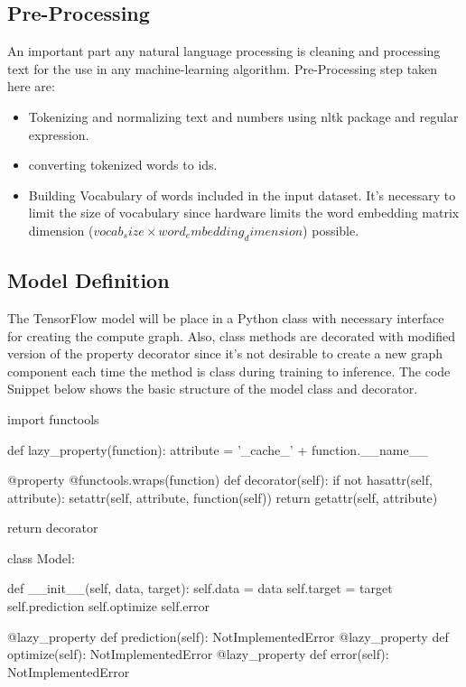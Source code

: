 \documentclass{article}
\begin{document}
\subsection{Pre-Processing}

An important part any natural language processing is cleaning and processing text for the use in any machine-learning algorithm. Pre-Processing step taken here are:

\begin{itemize}

        \item Tokenizing and normalizing text and numbers using nltk package and regular expression.
        \item converting tokenized words to ids.
        \item Building Vocabulary of words included in the input dataset. It's necessary to limit the size of vocabulary since hardware limits the word embedding matrix dimension ($vocab_size \times word_embedding_dimension$) possible.

\end{itemize}

\subsection{Model Definition}

The TensorFlow model will be place in a Python class with necessary interface for creating the compute graph. Also, class methods are decorated with modified version of the property decorator since it's not desirable to create a new graph component each time the method is class during training to inference. The code Snippet below shows the basic structure of the model class and decorator.


\begin{python}

        import functools

        def lazy_property(function):
                attribute = '_cache_' + function.__name__

                @property
                @functools.wraps(function)
                def decorator(self):
                        if not hasattr(self, attribute):
                        setattr(self, attribute, function(self))
                        return getattr(self, attribute)

                return decorator
\end{python}


\begin{python}
        class Model:

        def __init__(self, data, target):
                self.data = data
                self.target = target
                self.prediction
                self.optimize
                self.error

        @lazy_property
        def prediction(self):
                NotImplementedError
        @lazy_property
        def optimize(self):
                NotImplementedError
        @lazy_property
        def error(self):
                NotImplementedError


\end{python}
\end{document}

